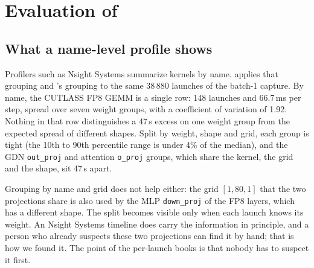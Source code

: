 \section{Evaluation of \sys{}}\label{sec:eval}

\subsection{What a name-level profile shows}\label{sec:namelevel}

Profilers such as Nsight Systems summarize kernels by name.  applies that
grouping and \sys{}'s grouping to the same 38\,880 launches of the batch-1 capture. By name, the
CUTLASS FP8 GEMM is a single row: 148 launches and 66.7\,ms per step, spread over seven weight
groups, with a coefficient of variation of 1.92. Nothing in that row distinguishes a 47\,\textmu s
excess on one weight group from the expected spread of different shapes. Split by weight, shape
and grid, each group is tight (the 10th to 90th percentile range is under 4\% of the median), and the GDN \texttt{out\_proj} and attention \texttt{o\_proj} groups, which share the
kernel, the grid and the shape, sit 47\,\textmu s apart.

Grouping by name and grid does not help either: the grid $[1,80,1]$ that the two projections
share is also used by the MLP \texttt{down\_proj} of the FP8 layers, which has a different shape.
The split becomes visible only when each launch knows its weight. An Nsight Systems timeline does
carry the information in principle, and a person who already suspects these two projections can
find it by hand; that is how we found it. The point of the per-launch books is that nobody has to
suspect it first.

